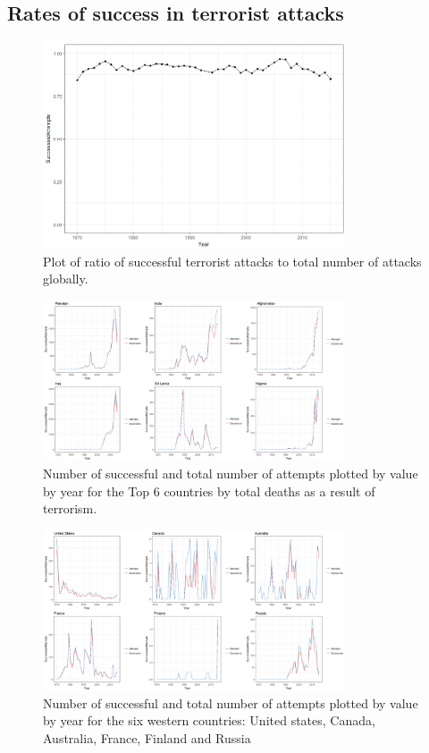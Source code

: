 \documentclass[10pt,a4paper]{article}
\begin{document}
\subsection{Rates of success in terrorist attacks}
\begin{center}
	
\begin{figure}[H]
	\includegraphics[width=0.8\textwidth]{Plots/OverTime/Successes_vs_Attempts_by_Year.png}
	\caption{Plot of ratio of successful terrorist attacks to total number of attacks globally.}
\end{figure}

\begin{figure}[H]
	\includegraphics[width=0.8\textwidth]{Plots/OverTime/Top6SuccessVsAttempts.png}
	\caption{Number of successful and total number of attempts plotted by value by year for the Top 6 countries by total deaths as a result of terrorism.}
\end{figure}

\begin{figure}[H]
	\includegraphics[width=0.8\textwidth]{Plots/OverTime/WesternSuccessVsAttempts.png}
	\caption{Number of successful and total number of attempts plotted by value by year for the six western countries: United states, Canada, Australia, France, Finland and Russia}
\end{figure}
	
\end{center}
\end{document}
